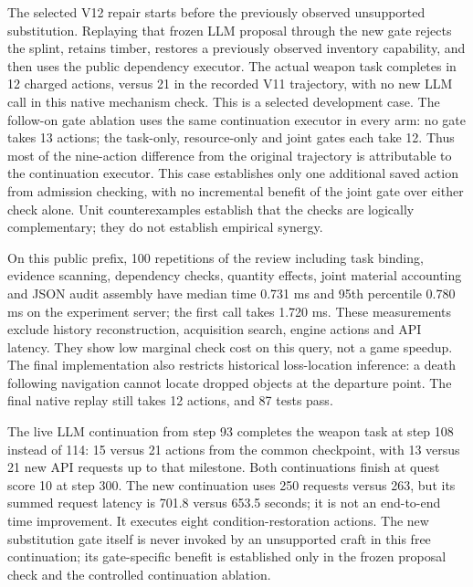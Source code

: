 \documentclass[11pt]{article}
\theoremstyle{definition}
\begin{document}
The selected V12 repair starts before the previously observed unsupported
substitution. Replaying that frozen LLM proposal through the new gate rejects
the splint, retains timber, restores a previously observed inventory capability,
and then uses the public dependency executor. The actual weapon task completes
in 12 charged actions, versus 21 in the recorded V11 trajectory, with no new
LLM call in this native mechanism check. This is a selected development case.
The follow-on gate ablation uses the same continuation executor in every arm:
no gate takes 13 actions; the task-only, resource-only and joint gates each take
12. Thus most of the nine-action difference from the original trajectory is
attributable to the continuation executor. This case establishes only one
additional saved action from admission checking, with no incremental benefit
of the joint gate over either check alone. Unit counterexamples establish that
the checks are logically complementary; they do not establish empirical synergy.

On this public prefix, 100 repetitions of the review including task binding,
evidence scanning, dependency checks, quantity effects, joint material accounting
and JSON audit assembly have median time 0.731 ms and 95th percentile 0.780 ms
on the experiment server; the first call takes 1.720 ms. These measurements
exclude history reconstruction, acquisition search, engine actions and API
latency. They show low marginal check cost on this query, not a game speedup.
The final implementation also restricts historical loss-location inference:
a death following navigation cannot locate dropped objects at the departure
point. The final native replay still takes 12 actions, and 87 tests pass.

The live LLM continuation from step 93 completes the weapon task at step 108
instead of 114: 15 versus 21 actions from the common checkpoint, with 13 versus
21 new API requests up to that milestone. Both continuations finish at quest
score 10 at step 300. The new continuation uses 250 requests versus 263, but its
summed request latency is 701.8 versus 653.5 seconds; it is not an end-to-end
time improvement. It executes eight condition-restoration actions. The new
substitution gate itself is never invoked by an unsupported craft in this free
continuation; its gate-specific benefit is established only in the frozen
proposal check and the controlled continuation ablation.
\end{document}
